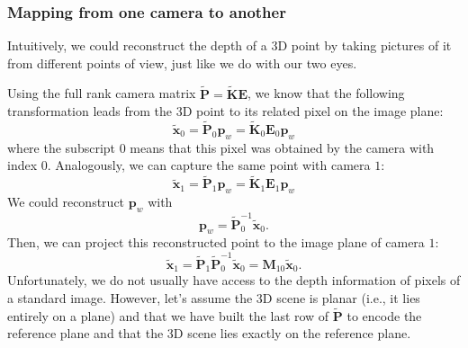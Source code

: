 \subsubsection{Mapping from one camera to another}
Intuitively, we could reconstruct the depth of a 3D point by taking pictures of it from different points of view, just like we do with our two eyes.

Using the full rank camera matrix $\tilde{\mathbf{P}}=\tilde{\mathbf{K}}\mathbf{E}$, we know that the following transformation leads from the 3D point to its related pixel on the image plane:
$$\tilde{\mathbf{x}}_{0}=\tilde{\mathbf{P}}_{0}\mathbf{p}_{w}=\tilde{\mathbf{K}}_{0}\mathbf{E}_{0}\mathbf{p}_{w}$$
where the subscript $0$ means that this pixel was obtained by the camera with index $0$.
Analogously, we can capture the same point with camera $1$:
$$\tilde{\mathbf{x}}_{1}=\tilde{\mathbf{P}}_{1}\mathbf{p}_{w}=\tilde{\mathbf{K}}_{1}\mathbf{E}_{1}\mathbf{p}_{w}$$
We could reconstruct $\mathbf{p}_{w}$ with
$$\mathbf{p}_{w}=\tilde{\mathbf{P}}_{0}^{-1}\tilde{\mathbf{x}}_{0}.$$
Then, we can project this reconstructed point to the image plane of camera $1$:
$$\tilde{\mathbf{x}}_{1}=\tilde{\mathbf{P}}_{1}\tilde{\mathbf{P}}^{-1}_{0}\tilde{\mathbf{x}}_{0}=\mathbf{M}_{10}\tilde{\mathbf{x}}_{0}.$$
Unfortunately, we do not usually have access to the depth information of pixels of a standard image. However, let's assume the 3D scene is planar (i.e., it lies entirely on a plane) and that we have built the last row of $\tilde{\mathbf{P}}$ to encode the reference plane and that the 3D scene lies exactly on the reference plane.


